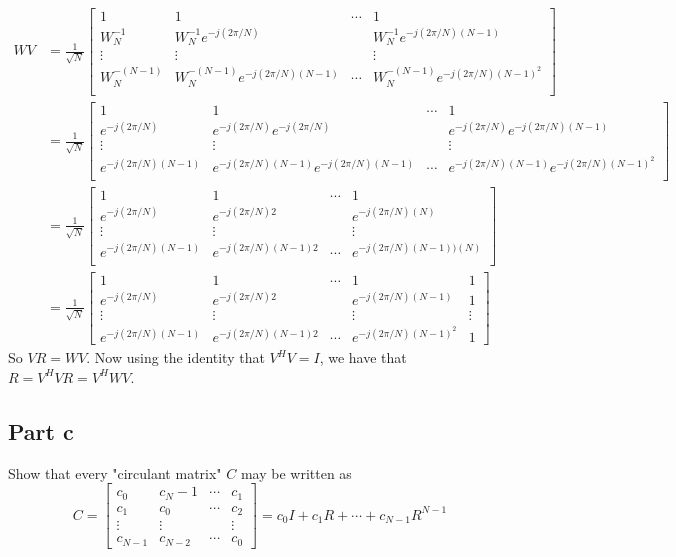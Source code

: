 \documentclass[a4paper]{article}
\begin{document}
\[
  \begin{aligned}
    WV &= \frac{1}{\sqrt{N}}
    \begin{bmatrix}
      1 & 1 & \cdots & 1 \\
      W_N^{-1} & W_N^{-1}e^{-j(2\pi/N)} & & W_N^{-1}e^{-j(2\pi/N)(N-1)} \\
      \vdots & \vdots & & \vdots \\
      W_N^{-(N-1)} & W_N^{-(N-1)}e^{-j(2\pi/N)(N-1)} & \cdots & W_N^{-(N-1)}e^{-j(2\pi/N)(N-1)^2} \\
    \end{bmatrix} \\
    &=
    \frac{1}{\sqrt{N}}
    \begin{bmatrix}
      1 & 1 & \cdots & 1 \\
      e^{-j(2\pi/N)} & e^{-j(2\pi/N)}e^{-j(2\pi/N)} & & e^{-j(2\pi/N)}e^{-j(2\pi/N)(N-1)} \\
      \vdots & \vdots & & \vdots \\
      e^{-j(2\pi/N)(N-1)} & e^{-j(2\pi/N)(N-1)}e^{-j(2\pi/N)(N-1)} & \cdots & e^{-j(2\pi/N)(N-1)}e^{-j(2\pi/N)(N-1)^2} \\
    \end{bmatrix} \\
    &= \frac{1}{\sqrt{N}}\begin{bmatrix}
      1 & 1 & \cdots & 1 \\
      e^{-j(2\pi/N)} & e^{-j(2\pi/N)2} & & e^{-j(2\pi/N)(N)} \\
      \vdots & \vdots & & \vdots \\
      e^{-j(2\pi/N)(N-1)} & e^{-j(2\pi/N)(N-1)2} & \cdots & e^{-j(2\pi/N)(N-1))(N)} \\
    \end{bmatrix} \\
    &=
    \frac{1}{\sqrt{N}}
    \begin{bmatrix}
      1 & 1 &  \cdots & 1 & 1 \\
      e^{-j(2\pi/N)}& e^{-j(2\pi/N)2} & & e^{-j(2\pi/N)(N-1)} & 1 \\
      \vdots & \vdots & &\vdots & \vdots \\
      e^{-j(2\pi/N)(N-1)} & e^{-j(2\pi/N)(N-1)2} & \cdots & e^{-j(2\pi/N)(N-1)^2} & 1
    \end{bmatrix}
  \end{aligned}
\]
So $VR = WV$. Now using the identity that $V^HV = I$, we have that $R = V^HVR = V^HWV$.

\subsection*{Part c}%
Show that every "circulant matrix" $C$ may be written as
\[
  C = 
  \begin{bmatrix}
    c_0 & c_N-1 & \cdots & c_1 \\
    c_1 & c_0 & \cdots & c_2 \\
    \vdots & \vdots & & \vdots \\
    c_{N-1} & c_{N-2} & \cdots & c_0
  \end{bmatrix}
  = c_0I + c_1R + \cdots + c_{N-1}R^{N-1}
\]
\end{document}
